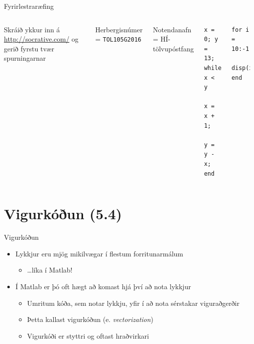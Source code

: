 \documentclass{beamer}
\begin{document}
\begin{frame}[fragile]{Fyrirlestraræfing}
\begin{columns}
Skráið ykkur inn á \url{http://socrative.com/} og gerið fyrstu tvær spurningarnar

Herbergisnúmer = \texttt{TOL105G2016}

Notendanafn = HÍ-tölvupóstfang
\begin{verbatim}
x = 0; y = 13;
while x < y
    x = x + 1;
    y = y - x;
end
\end{verbatim}
\begin{verbatim}
for i = 10:-1:1
    disp(i);
end
\end{verbatim}
\end{columns}
\end{frame}

\section{Vigurkóðun (5.4)}

\begin{frame}{Vigurkóðun}
\begin{itemize}
 \item Lykkjur eru mjög mikilvægar í flestum forritunarmálum
 \begin{itemize}
  \item \ldots líka í Matlab!
 \end{itemize}
 \item Í Matlab er þó oft hægt að komast hjá því að nota lykkjur
 \begin{itemize}
  \item Umritum kóða, sem notar lykkju, yfir í að nota sérstakar viguraðgerðir
  \item Þetta kallast vigurkóðun (e. \emph{vectorization})
  \item Vigurkóði er styttri og oftast hraðvirkari
 \end{itemize}
\end{itemize}
\end{frame}
\end{document}
